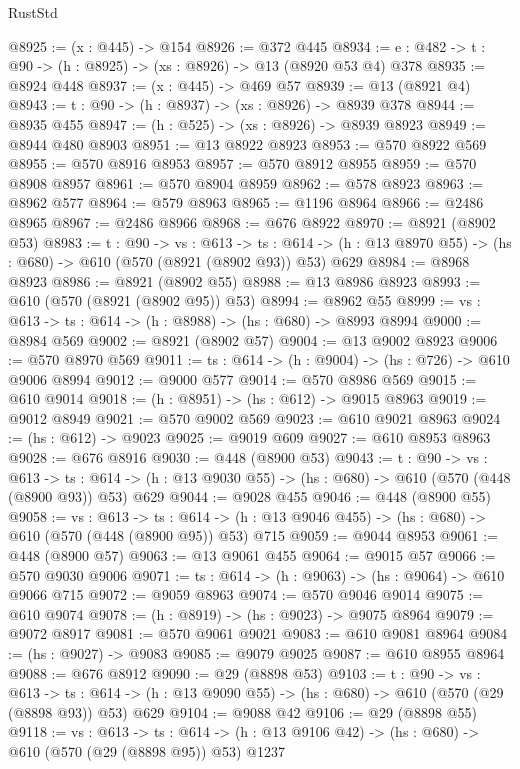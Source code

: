 \begin{lexlean}{RustStd}
\begin{coremodule}
@8925 := (x : @445) -> @154
@8926 := @372 @445
@8934 := {e : @482} -> {t : @90} -> (h : @8925) -> (xs : @8926) -> @13 (@8920 @53 @4) @378
@8935 := @8924 @448
@8937 := (x : @445) -> @469 @57
@8939 := @13 (@8921 @4)
@8943 := {t : @90} -> (h : @8937) -> (xs : @8926) -> @8939 @378
@8944 := @8935 @455
@8947 := (h : @525) -> (xs : @8926) -> @8939 @8923
@8949 := @8944 @480 @8903
@8951 := @13 @8922 @8923
@8953 := @570 @8922 @569
@8955 := @570 @8916 @8953
@8957 := @570 @8912 @8955
@8959 := @570 @8908 @8957
@8961 := @570 @8904 @8959
@8962 := @578 @8923
@8963 := @8962 @577
@8964 := @579 @8963
@8965 := @1196 @8964
@8966 := @2486 @8965
@8967 := @2486 @8966
@8968 := @676 @8922
@8970 := @8921 (@8902 @53)
@8983 := {t : @90} ->
  {vs : @613} ->
  {ts : @614} -> (h : @13 @8970 @55) -> (hs : @680) -> @610 (@570 (@8921 (@8902 @93)) @53) @629
@8984 := @8968 @8923
@8986 := @8921 (@8902 @55)
@8988 := @13 @8986 @8923
@8993 := @610 (@570 (@8921 (@8902 @95)) @53)
@8994 := @8962 @55
@8999 := {vs : @613} -> {ts : @614} -> (h : @8988) -> (hs : @680) -> @8993 @8994
@9000 := @8984 @569
@9002 := @8921 (@8902 @57)
@9004 := @13 @9002 @8923
@9006 := @570 @8970 @569
@9011 := {ts : @614} -> (h : @9004) -> (hs : @726) -> @610 @9006 @8994
@9012 := @9000 @577
@9014 := @570 @8986 @569
@9015 := @610 @9014
@9018 := (h : @8951) -> (hs : @612) -> @9015 @8963
@9019 := @9012 @8949
@9021 := @570 @9002 @569
@9023 := @610 @9021 @8963
@9024 := (hs : @612) -> @9023
@9025 := @9019 @609
@9027 := @610 @8953 @8963
@9028 := @676 @8916
@9030 := @448 (@8900 @53)
@9043 := {t : @90} ->
  {vs : @613} ->
  {ts : @614} -> (h : @13 @9030 @55) -> (hs : @680) -> @610 (@570 (@448 (@8900 @93)) @53) @629
@9044 := @9028 @455
@9046 := @448 (@8900 @55)
@9058 := {vs : @613} ->
  {ts : @614} -> (h : @13 @9046 @455) -> (hs : @680) -> @610 (@570 (@448 (@8900 @95)) @53) @715
@9059 := @9044 @8953
@9061 := @448 (@8900 @57)
@9063 := @13 @9061 @455
@9064 := @9015 @57
@9066 := @570 @9030 @9006
@9071 := {ts : @614} -> (h : @9063) -> (hs : @9064) -> @610 @9066 @715
@9072 := @9059 @8963
@9074 := @570 @9046 @9014
@9075 := @610 @9074
@9078 := (h : @8919) -> (hs : @9023) -> @9075 @8964
@9079 := @9072 @8917
@9081 := @570 @9061 @9021
@9083 := @610 @9081 @8964
@9084 := (hs : @9027) -> @9083
@9085 := @9079 @9025
@9087 := @610 @8955 @8964
@9088 := @676 @8912
@9090 := @29 (@8898 @53)
@9103 := {t : @90} ->
  {vs : @613} ->
  {ts : @614} -> (h : @13 @9090 @55) -> (hs : @680) -> @610 (@570 (@29 (@8898 @93)) @53) @629
@9104 := @9088 @42
@9106 := @29 (@8898 @55)
@9118 := {vs : @613} ->
  {ts : @614} -> (h : @13 @9106 @42) -> (hs : @680) -> @610 (@570 (@29 (@8898 @95)) @53) @1237

\end{coremodule}
\end{lexlean}
